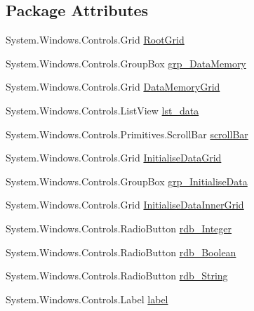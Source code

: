 \subsection*{Package Attributes}
\begin{DoxyCompactItemize}
\item 
System.\+Windows.\+Controls.\+Grid \hyperlink{class_c_p_u___o_s___simulator_1_1_memory_window_ae2c7b1b6f5c337af62d18b0e2a4d098c}{Root\+Grid}
\item 
System.\+Windows.\+Controls.\+Group\+Box \hyperlink{class_c_p_u___o_s___simulator_1_1_memory_window_a283493c20704b70efe355621cd6e5aa4}{grp\+\_\+\+Data\+Memory}
\item 
System.\+Windows.\+Controls.\+Grid \hyperlink{class_c_p_u___o_s___simulator_1_1_memory_window_a93e699c04992f66b92f0d3b834f267d1}{Data\+Memory\+Grid}
\item 
System.\+Windows.\+Controls.\+List\+View \hyperlink{class_c_p_u___o_s___simulator_1_1_memory_window_a00f6d6a33f4c35800f2e316de335e4dd}{lst\+\_\+data}
\item 
System.\+Windows.\+Controls.\+Primitives.\+Scroll\+Bar \hyperlink{class_c_p_u___o_s___simulator_1_1_memory_window_a2ab8c6459135d66de58829173f0bee5b}{scroll\+Bar}
\item 
System.\+Windows.\+Controls.\+Grid \hyperlink{class_c_p_u___o_s___simulator_1_1_memory_window_aed90d987403a12a322183d032544c507}{Initialise\+Data\+Grid}
\item 
System.\+Windows.\+Controls.\+Group\+Box \hyperlink{class_c_p_u___o_s___simulator_1_1_memory_window_a6cfa52c953fe5704090e7e9f4ac2c9d1}{grp\+\_\+\+Initialise\+Data}
\item 
System.\+Windows.\+Controls.\+Grid \hyperlink{class_c_p_u___o_s___simulator_1_1_memory_window_a2f298db1546fe63bca79b0a810304381}{Initialise\+Data\+Inner\+Grid}
\item 
System.\+Windows.\+Controls.\+Radio\+Button \hyperlink{class_c_p_u___o_s___simulator_1_1_memory_window_ae54a50c88d1e1479fceddd6d3a51a974}{rdb\+\_\+\+Integer}
\item 
System.\+Windows.\+Controls.\+Radio\+Button \hyperlink{class_c_p_u___o_s___simulator_1_1_memory_window_a728a4d572f38d0fe2063005d138d8c32}{rdb\+\_\+\+Boolean}
\item 
System.\+Windows.\+Controls.\+Radio\+Button \hyperlink{class_c_p_u___o_s___simulator_1_1_memory_window_a68b5f36b0514cacaa8e4eeb3415fcd5a}{rdb\+\_\+\+String}
\item 
System.\+Windows.\+Controls.\+Label \hyperlink{class_c_p_u___o_s___simulator_1_1_memory_window_ad5fa08b25fc582e9b2f7c305ed12a960}{label}

\end{DoxyCompactItemize}
